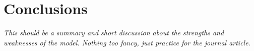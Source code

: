 \chapter{Conclusions}
\label{conclusions}

\textit{This should be a summary and short discussion about the
  strengths and weaknesses of the model. Nothing too fancy, just
  practice for the journal article.}

